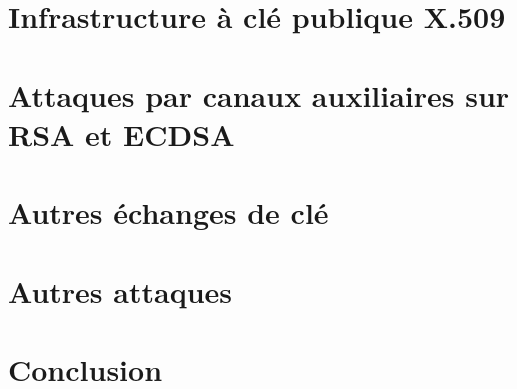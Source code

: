 \documentclass{mpg-ep-slides}
\begin{document}
\section[PKIX]{Infrastructure à clé publique X.509}
\tocsect


\section[Timing]{Attaques par canaux auxiliaires sur RSA et ECDSA}
\tocsect


\section[Échanges]{Autres échanges de clé}
\tocsect


\section[Attaques]{Autres attaques}
\tocsect


\section{Conclusion}
\tocsect

\end{document}
